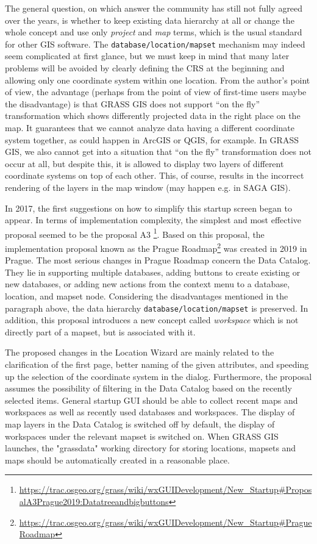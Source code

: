 \documentclass[a4paper,10pt,twoside]{article}
\begin{document}
The general question, on which answer the community has still not fully agreed over the years, is whether to keep existing data hierarchy at all or change the whole concept and use only \textit{project} and \textit{map} terms, which is the usual standard for other GIS software. The \texttt {database/location/mapset} mechanism may indeed seem complicated at first glance, but we must keep in mind that many later problems will be avoided by clearly defining the CRS at the beginning and allowing only one coordinate system within one location. From the author’s point of view, the advantage (perhaps from the point of view of first-time users maybe the disadvantage) is that GRASS GIS does not support ``on the fly'' transformation which shows differently projected data in the right place on the map. It guarantees that we cannot analyze data having a different coordinate system together, as could happen in ArcGIS or QGIS, for example. In GRASS GIS, we also cannot get into a situation that ``on the fly'' transformation does not occur at all, but despite this, it is allowed to display two layers of different coordinate systems on top of each other. This, of course, results in the incorrect rendering of the layers in the map window (may happen e.g. in SAGA GIS). 

In 2017, the first suggestions on how to simplify this startup screen began to appear. In terms of implementation complexity, the simplest and most effective proposal seemed to be the proposal A3 \footnote{\url{https://trac.osgeo.org/grass/wiki/wxGUIDevelopment/New\_Startup\#ProposalA3Prague2019:Datatreeandbigbuttons}}. Based on this proposal, the implementation proposal known as the Prague Roadmap\footnote{\url{https://trac.osgeo.org/grass/wiki/wxGUIDevelopment/New\_Startup\#PragueRoadmap}} was created in 2019 in Prague. 
The most serious changes in Prague Roadmap concern the Data Catalog. They lie in supporting multiple databases, adding buttons to create existing or new databases, or adding new actions from the context menu to a database, location, and mapset node. Considering the disadvantages mentioned in the paragraph above, the data hierarchy \texttt{database/location/mapset} is preserved. In addition, this proposal introduces a new concept called \textit{workspace} which is not directly part of a mapset, but is associated with it.

The proposed changes in the Location Wizard are mainly related to the clarification of the first page, better naming of the given attributes, and speeding up the selection of the coordinate system in the dialog. Furthermore, the proposal assumes the possibility of filtering in the Data Catalog based on the recently selected items. General startup GUI should be able to collect recent maps and workspaces as well as recently used databases and workspaces. The display of map layers in the Data Catalog is switched off by default, the display of workspaces under the relevant mapset is switched on. When GRASS GIS launches, the "grassdata" working directory for storing locations, mapsets and maps should be automatically created in a reasonable place.
\end{document}
